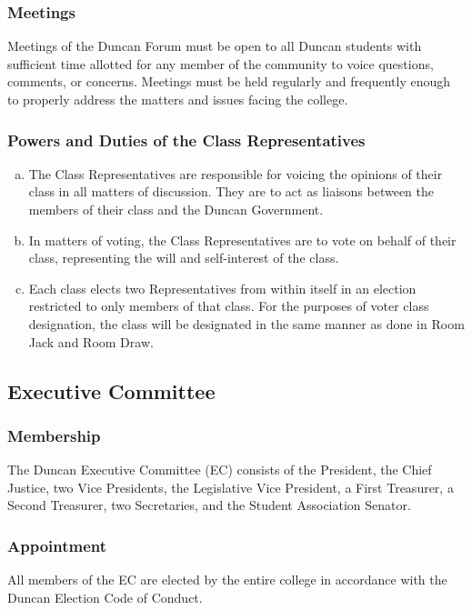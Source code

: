 \documentclass[USletter,12pt]{article}
\begin{document}
\subsubsection{Meetings}
Meetings of the Duncan Forum must be open to all Duncan students with sufficient time allotted for any member of the community to voice questions, comments, or concerns. Meetings must be held regularly and frequently enough to properly address the matters and issues facing the college.

\subsubsection{Powers and Duties of the Class Representatives}
\begin{enumerate}[(a)]
\item The Class Representatives are responsible for voicing the opinions of their class in all matters of discussion.  They are to act as liaisons between the members of their class and the Duncan Government.
\item In matters of voting, the Class Representatives are to vote on behalf of their class, representing the will and self-interest of the class.
\item Each class elects two Representatives from within itself in an election restricted to only members of that class.  For the purposes of voter class designation, the class will be designated in the same manner as done in Room Jack and Room Draw.
\end{enumerate}



\subsection{Executive Committee}


\subsubsection{Membership}
The Duncan Executive Committee (EC) consists of the President, the Chief Justice, two Vice Presidents, the Legislative Vice President, a First Treasurer, a Second Treasurer, two Secretaries, and the Student Association Senator.

\subsubsection{Appointment}
All members of the EC are elected by the entire college in accordance with the Duncan Election Code of Conduct.
\end{document}
